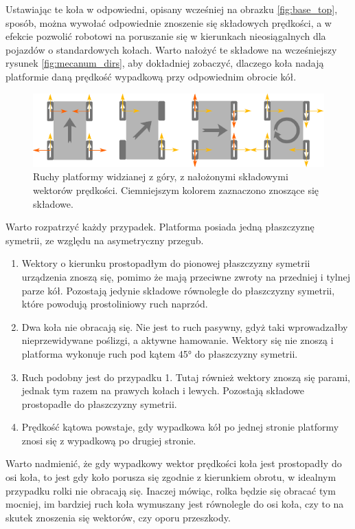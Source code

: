 	Ustawiając te koła w odpowiedni, opisany wcześniej na obrazku \ref{fig:base_top}, sposób, można wywołać odpowiednie znoszenie się składowych prędkości,
	a w efekcie pozwolić robotowi na poruszanie się w kierunkach nieosiągalnych dla pojazdów o standardowych kołach.
	Warto nałożyć te składowe na wcześniejszy rysunek \ref{fig:mecanum_dirs}, aby dokładniej zobaczyć, 
	dlaczego koła nadają platformie daną prędkość wypadkową przy odpowiednim obrocie kół.

	\begin{figure}[H]
	\centering
	\includegraphics[width=\textwidth]{graphics/mecanum_dirs_vect.pdf}
	\caption{Ruchy platformy widzianej z góry, z nałożonymi składowymi wektorów prędkości. Ciemniejszym kolorem zaznaczono znoszące się składowe.}
	\label{fig:mecanum_dirs_vect}
	\end{figure} 

	Warto rozpatrzyć każdy przypadek. Platforma posiada jedną płaszczyznę symetrii, ze względu na asymetryczny przegub.
	\begin{enumerate}
		\item Wektory o kierunku prostopadłym do pionowej płaszczyzny symetrii urządzenia znoszą się, pomimo że mają przeciwne zwroty na przedniej i tylnej parze kół.
		Pozostają jedynie składowe równoległe do płaszczyzny symetrii, które powodują prostoliniowy ruch naprzód.
		\item Dwa koła nie obracają się. Nie jest to ruch pasywny, gdyż taki wprowadzałby nieprzewidywane poślizgi, a aktywne hamowanie.
		Wektory się nie znoszą i platforma wykonuje ruch pod kątem 45° do płaszczyzny symetrii.
		\item Ruch podobny jest do przypadku 1. Tutaj również wektory znoszą się parami, jednak tym razem na prawych kołach i lewych. 
		Pozostają składowe prostopadłe do płaszczyzny symetrii.
		\item Prędkość kątowa powstaje, gdy wypadkowa kół po jednej stronie platformy znosi się z wypadkową po drugiej stronie.
	\end{enumerate}

	Warto nadmienić, że gdy wypadkowy wektor prędkości koła jest prostopadły do osi koła, to jest gdy
	koło porusza się zgodnie z kierunkiem obrotu, w idealnym przypadku rolki nie obracają się.
	Inaczej mówiąc, rolka będzie się obracać tym mocniej, im bardziej ruch koła wymuszany jest równolegle do osi koła, 
	czy to na skutek znoszenia się wektorów, czy oporu przeszkody.
	

